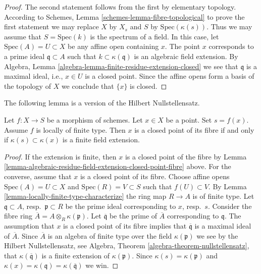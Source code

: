 \begin{proof}
The second statement follows from the first by elementary topology.
According to Schemes, Lemma \ref{schemes-lemma-fibre-topological}
to prove the first statement
we may replace $X$ by $X_s$ and $S$ by $\text{Spec}(\kappa(s))$.
Thus we may assume that $S = \text{Spec}(k)$ is the spectrum of a field.
In this case, let $\text{Spec}(A) = U \subset X$ be any affine open
containing $x$. The point $x$ corresponds to a prime ideal
$\mathfrak q \subset A$ such that $k \subset \kappa(\mathfrak q)$
is an algebraic field extension. By
Algebra, Lemma \ref{algebra-lemma-finite-residue-extension-closed}
we see that $\mathfrak q$ is a maximal ideal, i.e., $x \in U$ is a
closed point. Since the affine opens form
a basis of the topology of $X$ we conclude that $\{x\}$ is closed.
\end{proof}

\noindent
The following lemma is a version of the Hilbert Nullstellensatz.

\begin{lemma}
\label{lemma-closed-point-fibre-locally-finite-type}
Let $f : X \to S$ be a morphism of schemes.
Let $x \in X$ be a point. Set $s = f(x)$.
Assume $f$ is locally of finite type.
Then $x$ is a closed point of its fibre
if and only if $\kappa(s) \subset \kappa(x)$ is
a finite field extension.
\end{lemma}

\begin{proof}
If the extension is finite, then $x$ is a closed point of
the fibre by
Lemma \ref{lemma-algebraic-residue-field-extension-closed-point-fibre}
above. For the converse, assume that $x$ is a closed point
of its fibre. Choose affine opens $\text{Spec}(A) = U \subset X$
and $\text{Spec}(R) = V \subset S$ such that $f(U) \subset V$.
By Lemma \ref{lemma-locally-finite-type-characterize} the ring map
$R \to A$ is of finite type. Let $\mathfrak q \subset A$,
resp.\ $\mathfrak p \subset R$ be the prime ideal corresponding
to $x$, resp.\ $s$. Consider the fibre ring
$\overline{A} = A \otimes_R \kappa(\mathfrak p)$.
Let $\overline{\mathfrak q}$ be the prime of $\overline{A}$
corresponding to $\mathfrak q$. The assumption that $x$
is a closed point of its fibre implies that $\overline{\mathfrak q}$
is a maximal ideal of $\overline{A}$. Since $\overline{A}$
is an algebra of finite type over the field $\kappa(\mathfrak p)$
we see by the Hilbert Nullstellensatz, see
Algebra, Theorem \ref{algebra-theorem-nullstellensatz},
that $\kappa(\overline{\mathfrak q})$ is a finite extension
of $\kappa(\mathfrak p)$.
Since $\kappa(s) = \kappa(\mathfrak p)$ and
$\kappa(x) = \kappa(\mathfrak q) = \kappa(\overline{\mathfrak q})$
we win.
\end{proof}

